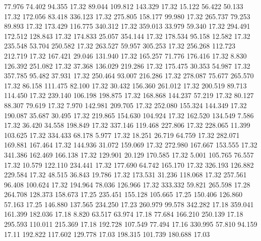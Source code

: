   77.976   74.402   94.355        17.32
  89.044  109.812  143.329        17.32
  15.122   56.422   50.133        17.32
 172.056   83.418  336.123        17.32
 275.805  158.177   99.980        17.32
 265.737   79.253   89.893        17.32
 173.429  116.775  340.312        17.32
 359.013   33.979   59.340        17.32
 294.491  172.512  128.843        17.32
 174.833   25.057  354.144        17.32
 178.534   95.158   12.582        17.32
 235.548   53.704  250.582        17.32
 263.527   59.957  305.253        17.32
 256.268  112.723  212.719        17.32
 167.421   29.046  131.940        17.32
 165.257   71.776  176.416        17.32
   8.830  126.392  251.082        17.32
  37.368  136.029  219.286        17.32
 175.475   30.353   54.987        17.32
 357.785   95.482   37.931        17.32
 250.464   93.007  216.286        17.32
 278.087   75.677  265.570        17.32
  86.158  111.475   82.100        17.32
  30.432  156.360  261.012        17.32
 200.519   89.713  114.450        17.32
 239.140  106.198  198.875        17.32
 168.868  144.237   57.219        17.32
  80.127   88.307   79.619        17.32
   7.970  142.981  209.705        17.32
 252.080  155.324  144.349        17.32
 190.087   35.687   30.495        17.32
 219.865  154.630  104.924        17.32
 162.520  134.549    7.586        17.32
  36.420   34.558  198.849        17.32
 337.146  119.468  227.806        17.32
 228.065   11.399  103.625        17.32
 334.433   68.178    5.977        17.32
  18.251   26.719   64.759        17.32
 282.071  169.881  167.464        17.32
 144.936   31.072  159.069        17.32
 272.980  167.667  153.555        17.32
 341.386  162.469  166.138        17.32
 129.901   20.129  170.585        17.32
   5.001  105.765   76.557        17.32
  10.579  122.110  234.441        17.32
 177.690   64.742  165.170        17.32
 326.193  126.882  229.584        17.32
  48.515   36.843   19.786        17.32
 173.531   31.236  118.068        17.32
 257.561   96.408  100.624        17.32
 194.964   78.036  126.966        17.32
 333.332   59.821  265.598        17.28
 264.708  128.373  158.673        17.25
 235.451  155.128  105.665        17.25
 150.406  126.860   57.163        17.25
 146.880  137.565  234.250        17.23
 260.979   99.578  342.282        17.18
 359.041  161.399  182.036        17.18
   8.820   63.517   63.974        17.18
  77.684  166.210  250.139        17.18
 295.593  110.011  215.369        17.18
 192.728  107.549   77.494        17.16
 330.995   57.810   94.159        17.11
 192.822  117.602  129.778        17.03
 198.315  101.739  180.688        17.03
